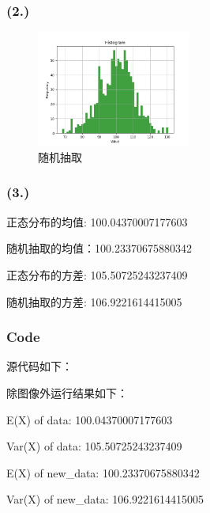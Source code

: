 \documentclass{article}
\begin{document}
\subsubsection*{(2.)}

\begin{center}
    \begin{figure}[H] %
        \centering %
        \includegraphics[width=0.45\textwidth]{img/Figure_2.png} %
        \caption{随机抽取} %
        \label{fig2} %
    \end{figure}
\end{center}

\subsubsection*{(3.)}

正态分布的均值: 100.04370007177603

随机抽取的均值：100.23370675880342

正态分布的方差: 105.50725243237409

随机抽取的方差: 106.9221614415005

\subsubsection*{Code}

源代码如下：



除图像外运行结果如下：

E(X) of data: 100.04370007177603

Var(X) of data: 105.50725243237409

E(X) of new\_data: 100.23370675880342

Var(X) of new\_data: 106.9221614415005
\end{document}
